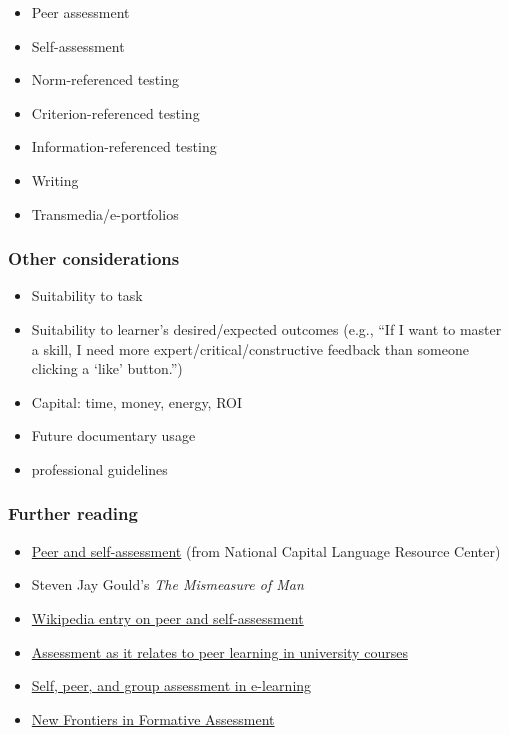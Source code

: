 \begin{itemize}
\item
  Peer assessment
\item
  Self-assessment
\item
  Norm-referenced testing
\item
  Criterion-referenced testing
\item
  Information-referenced testing
\item
  Writing
\item
  Transmedia/e-portfolios
\end{itemize}
\subsubsection{Other considerations}

\begin{itemize}
\item
  Suitability to task
\item
  Suitability to learner's desired/expected outcomes (e.g., ``If I want
  to master a skill, I need more expert/critical/constructive feedback
  than someone clicking a `like' button.'')
\item
  Capital: time, money, energy, ROI
\item
  Future documentary usage
\item
  professional guidelines
\end{itemize}
\subsubsection{Further reading}

\begin{itemize}
\item
  \href{http://www.nclrc.org/essentials/assessing/peereval.htm}{Peer and
  self-assessment} (from National Capital Language Resource Center)
\item
  Steven Jay Gould's \emph{The Mismeasure of Man}
\item
  \href{http://en.wikipedia.org/wiki/Self-\_and\_Peer-Assessment}{Wikipedia
  entry on peer and self-assessment}
\item
  \href{http://www.elearning-reviews.org/topics/pedagogy/assessment/1999-boud-et-al-peer-learning-assessment/}{Assessment
  as it relates to peer learning in university courses}
\item
  \href{http://www.eric.ed.gov/ERICWebPortal/detail?accno=ED501727}{Self,
  peer, and group assessment in e-learning}
\item
  \href{http://www.hepg.org/hep/book/151}{New Frontiers in Formative
  Assessment}
\end{itemize}
